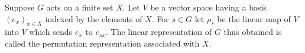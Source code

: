 Suppose $G$ acts on a finite set $X$. Let $V$ be a vector space having a basis $(e_x)_{x \in X}$ indexed by the elements of $X$.
For $s \in G$ let $\rho_s$ be the linear map of $V$ into $V$ which sends $e_x$ to $e_{sx}$.
The linear representation of $G$ thus obtained is called the permutation representation associated with $X$.
